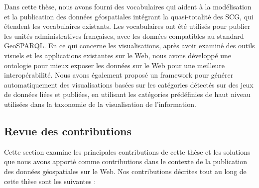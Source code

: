 Dans cette th\`{e}se, nous avons fourni des vocabulaires qui aident \`{a} la mod\'{e}lisation et la publication des donn\'{e}es g\'{e}ospatiales int\'{e}grant la quasi-totalit\'{e} des SCG, qui \'{e}tendent les vocabulaires existants. Les vocabulaires ont \'{e}t\'{e} utilis\'{e}s pour publier les unit\'{e}s administratives fran\c{c}aises, avec les donn\'{e}es compatibles au standard GeoSPARQL. En ce qui concerne les visualisations, apr\`{e}s avoir examin\'{e} des outils visuels et les applications existantes sur le Web, nous avons d\'{e}velopp\'{e} une ontologie pour mieux exposer les donn\'{e}es sur le Web pour une meilleure interop\'{e}rabilit\'{e}. Nous avons \'{e}galement propos\'{e} un framework pour g\'{e}n\'{e}rer automatiquement des visualisations bas\'{e}es sur les cat\'{e}gories d\'{e}tect\'{e}s sur des jeux de donn\'{e}es li\'{e}es et publi\'{e}es, en utilisant les cat\'{e}gories pr\'{e}d\'{e}finies de haut niveau utilis\'{e}es dans la taxonomie de la visualisation de l'information.

\subsection*{Revue des contributions}
Cette section examine les principales contributions de cette th\`{e}se et les solutions que nous avons apport\'{e} comme contributions dans le contexte de la publication des donn\'{e}es g\'{e}ospatiales sur le Web. Nos contributions d\'{e}crites tout au long de cette th\`{e}se sont les suivantes :

